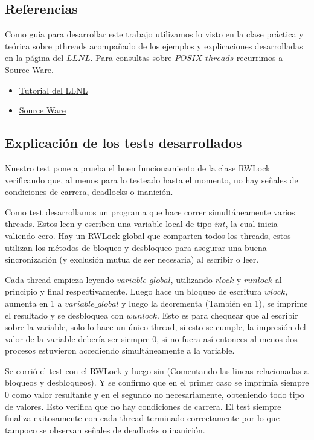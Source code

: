 \subsection{Referencias}

Como guía para desarrollar este trabajo utilizamos lo visto en la clase práctica y teórica sobre pthreads acompañado de los ejemplos y explicaciones desarrolladas en la página  del $LLNL$. Para consultas sobre $POSIX$ $threads$ recurrimos a Source Ware.

\begin{itemize}

\item \href{https://computing.llnl.gov/tutorials/pthreads/}{Tutorial del LLNL}

\item \href{https://www.sourceware.org/pthreads-win32/manual/}{Source Ware}

\end{itemize}

\subsection{Explicación de los tests desarrollados}

Nuestro test pone a prueba el buen funcionamiento de la clase RWLock verificando que, al menos para lo testeado hasta el momento, no hay señales de condiciones de carrera, deadlocks o inanición. 

Como test desarrollamos un programa que hace correr simultáneamente varios threads. Estos leen y escriben una variable local de tipo $int$, la cual inicia valiendo cero. Hay un RWLock global que comparten todos los threads, estos utilizan los métodos de bloqueo y desbloqueo para asegurar una buena sincronización (y exclusión mutua de ser necesaria) al escribir o leer.

Cada thread empieza leyendo $variable\_global$, utilizando $rlock$ y $runlock$ al principio y final respectivamente. Luego hace un bloqueo de escritura $wlock$, aumenta en 1 a $variable\_global$ y luego la decrementa (También en 1), se imprime el resultado y se desbloquea con $wunlock$. Esto es para chequear que al escribir sobre la variable, solo lo hace un único thread, si esto se cumple, la impresión del valor de la variable debería ser siempre $0$, si no fuera así entonces al menos dos procesos estuvieron accediendo simultáneamente a la variable.

Se corrió el test con el RWLock y luego sin (Comentando las lineas relacionadas a bloqueos y desbloqueos). Y se confirmo que en el primer caso se imprimía siempre 0 como valor resultante y en el segundo no necesariamente, obteniendo todo tipo de valores. Esto verifica que no hay condiciones de carrera. El test siempre finaliza exitosamente con cada thread terminado correctamente por lo que tampoco se observan señales de deadlocks o inanición.

